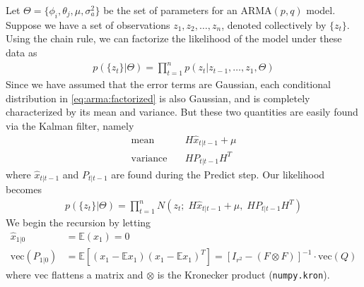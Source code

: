 Let $\Theta = \{\phi_i, \theta_j, \mu, \sigma_a^2\}$ be the set of parameters
for an $\text{ARMA}(p,q)$ model. 
Suppose we have a set of observations $z_1,z_2,\ldots,z_n$, denoted
collectively by $\{z_t\}$.
Using the chain rule, we can factorize the
likelihood of the model under these data as
\begin{align}
    \label{eq:arma:factorized}
    p(\{z_t\} | \Theta) = \prod_{t=1}^{n} p(z_t | z_{t-1}, \ldots, z_{1},
    \Theta)
\end{align}
Since we have assumed that the error terms are Gaussian, each conditional
distribution in \ref{eq:arma:factorized} is also Gaussian, and is completely
characterized by its mean and variance. But these two quantities are easily
found via the Kalman filter, namely
\begin{align}
    \text{mean} & \quad H\hat{x}_{t|t-1} + \mu \\
    \text{variance} & \quad HP_{t|t-1}H^T
\end{align}
where $\hat{x}_{t|t-1}$ and $P_{t|t-1}$ are found during the Predict step. Our
likelihood becomes
\begin{align}
    \label{eq:arma:likelihood}
    p(\{z_t\} | \Theta) = \prod_{t=1}^{n} N(z_t;\; H\hat{x}_{t|t-1} + \mu,\;
    HP_{t|t-1}H^T)
\end{align}
We begin the recursion by letting
\begin{align}
    \hat{x}_{1|0} &= \mathbb{E}(x_1) = 0 \\
    \text{vec}(P_{1|0}) &= \mathbb{E}\left[(x_1 - \mathbb{E}x_1)(x_1 -
    \mathbb{E}x_1)^T\right] = \left[I_{r^2} - (F \otimes F)\right]^{-1} \cdot
    \text{vec}(Q)
\end{align}
where $\text{vec}$ flattens a matrix and $\otimes$ is the Kronecker product
({\tt numpy.kron}).

